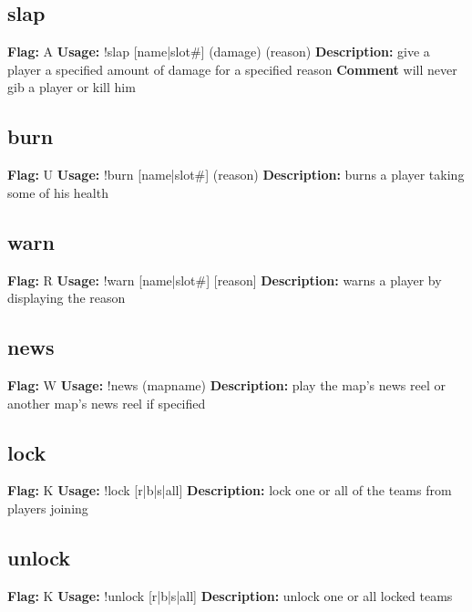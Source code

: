 \subsection{slap}
\textbf{Flag:} \hfill A \linebreak\textbf{Usage:} \hfill !slap [name|slot\#] (damage) (reason) \linebreak
\textbf{Description:} \hfill give a player a specified amount of damage for a specified reason
\linebreak
\textbf{Comment} \hfill will never gib a player or kill him

\subsection{burn}
\textbf{Flag:} \hfill U \linebreak\textbf{Usage:} \hfill !burn [name|slot\#] (reason) \linebreak
\textbf{Description:} \hfill burns a player taking some of his health

\subsection{warn}
\textbf{Flag:} \hfill R \linebreak\textbf{Usage:} \hfill !warn [name|slot\#] [reason] \linebreak
\textbf{Description:} \hfill warns a player by displaying the reason

\subsection{news}
\textbf{Flag:} \hfill W \linebreak\textbf{Usage:} \hfill !news (mapname) \linebreak
\textbf{Description:} \hfill play the map's news reel or another map's news reel if specified

\subsection{lock}
\textbf{Flag:} \hfill K \linebreak\textbf{Usage:} \hfill !lock [r|b|s|all] \linebreak
\textbf{Description:} \hfill lock one or all of the teams from players joining

\subsection{unlock}
\textbf{Flag:} \hfill K \linebreak\textbf{Usage:} \hfill !unlock [r|b|s|all] \linebreak
\textbf{Description:} \hfill unlock one or all locked teams

